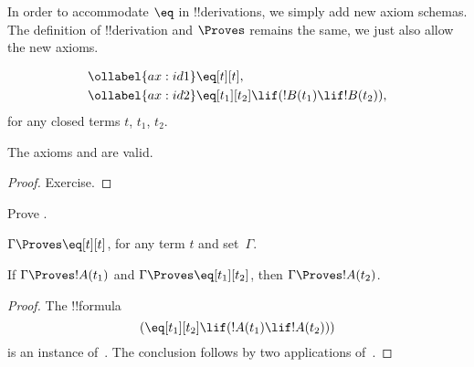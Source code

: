 \documentclass[../../../include/open-logic-section]{subfiles}
\begin{document}

In order to accommodate $\eq$ in !!{derivation}s, we simply add new
axiom schemas. The definition of !!{derivation} and $\Proves$ remains
the same, we just also allow the new axioms.

\begin{defn}
\begin{align}
\ollabel{ax:id1} & \eq[t][t], \\
\ollabel{ax:id2} & \eq[t_1][t_2] \lif (!B(t_1) \lif
  !B(t_2)),
\end{align}
for any closed terms $t$, $t_1$, $t_2$.
\end{defn}

\begin{prop}
  The axioms  and  are valid.
\end{prop}

\begin{proof}
  Exercise.
\end{proof}

\begin{prob}
Prove .
\end{prob}

\begin{prop}
 $\Gamma \Proves \eq[t][t]$, for any term $t$ and set~$\Gamma$.
\end{prop}

\begin{prop}
  If $\Gamma \Proves !A(t_1)$ and $\Gamma \Proves
  \eq[t_1][t_2]$, then $\Gamma \Proves !A(t_2)$.
\end{prop}

\begin{proof}
The !!{formula}
\[
(\eq[t_1][t_2] \lif (!A(t_1) \lif !A(t_2)))
\]
is an instance of~. The conclusion follows by two applications
of~\MP.
\end{proof}
\end{document}
